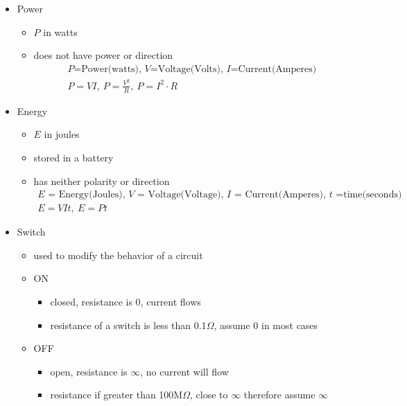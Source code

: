 \documentclass[10pt, letterpaper]{article}
\begin{document}
\begin{itemize}
  \item Power
  \begin{itemize}
    \item $P$ in watts
    \item does not have power or direction
    \begin{gather*}
      \text{$P$=Power(watts), $V$=Voltage(Volts), $I$=Current(Amperes)}\\
      P=VI, ~P=\frac{V^2}{R}, ~P=I^2 \cdot R
    \end{gather*}
  \end{itemize}

  \item Energy
  \begin{itemize}
    \item $E$ in joules
    \item stored in a battery
    \item has neither polarity or direction
    \begin{gather*}
      \text{$E$ = Energy(Joules), $V$ = Voltage(Voltage), $I$ = Current(Amperes), $t$ =time(seconds)}\\
      E=VIt, ~E=Pt
    \end{gather*}
  \end{itemize}

  \item Switch
  \begin{itemize}
    \item used to modify the behavior of a circuit
    \item ON
    \begin{itemize}
      \item closed, resistance is 0, current flows
      \item resistance of a switch is less than 0.1$\Omega$, assume 0 in most cases
    \end{itemize}
    \item OFF
    \begin{itemize}
      \item open, resistance is $\infty$, no current will flow
      \item resistance if greater than 100M$\Omega$, close to $\infty$ therefore assume $\infty$
    \end{itemize}
  \end{itemize}


\end{itemize}
\end{document}
